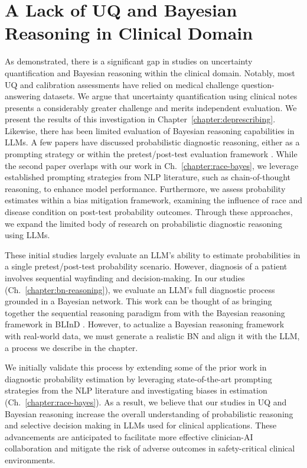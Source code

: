 \section{A Lack of UQ and Bayesian Reasoning in Clinical Domain}
As demonstrated, there is a significant gap in studies on uncertainty quantification and Bayesian reasoning within the clinical domain. Notably, most UQ and calibration assessments have relied on medical challenge question-answering datasets. We argue that uncertainty quantification using clinical notes presents a considerably greater challenge and merits independent evaluation. We present the results of this investigation in Chapter~\ref{chapter:deprescribing}. Likewise, there has been limited evaluation of Bayesian reasoning capabilities in LLMs. A few papers have discussed probabilistic diagnostic reasoning, either as a prompting strategy \citep{savageDiagnosticReasoningPrompts2024} or within the pretest/post-test evaluation framework \citep{rodmanArtificialIntelligenceVs2023}. While the second paper overlaps with our work in Ch.~\ref{chapter:race-bayes}, we leverage established prompting strategies from NLP literature, such as chain-of-thought reasoning, to enhance model performance. Furthermore, we assess probability estimates within a bias mitigation framework, examining the influence of race and disease condition on post-test probability outcomes. Through these approaches, we expand the limited body of research on probabilistic diagnostic reasoning using LLMs.

These initial studies largely evaluate an LLM's ability to estimate probabilities in a single pretest/post-test probability scenario. However, diagnosis of a patient involves sequential wayfinding \citep{adler-milsteinNextGenerationArtificialIntelligence2021} and decision-making. In our studies (Ch.~\ref{chapter:bn-reasoning}), we evaluate an LLM's full diagnostic process grounded in a Bayesian network. This work can be thought of as bringing together the sequential reasoning paradigm from \citet{hagerEvaluationMitigationLimitations2024} with the Bayesian reasoning framework in BLInD \citep{nafarProbabilisticReasoningGenerative2024}. However, to actualize a Bayesian reasoning framework with real-world data, we must generate a realistic BN and align it with the LLM, a process we describe in the chapter. 

We initially validate this process by extending some of the prior work in diagnostic probability estimation by leveraging state-of-the-art prompting strategies from the NLP literature and investigating biases in estimation (Ch.~\ref{chapter:race-bayes}). As a result, we believe that our studies in UQ and Bayesian reasoning increase the overall understanding of probabilistic reasoning and selective decision making in LLMs used for clinical applications. These advancements are anticipated to facilitate more effective clinician-AI collaboration and mitigate the risk of adverse outcomes in safety-critical clinical environments.
